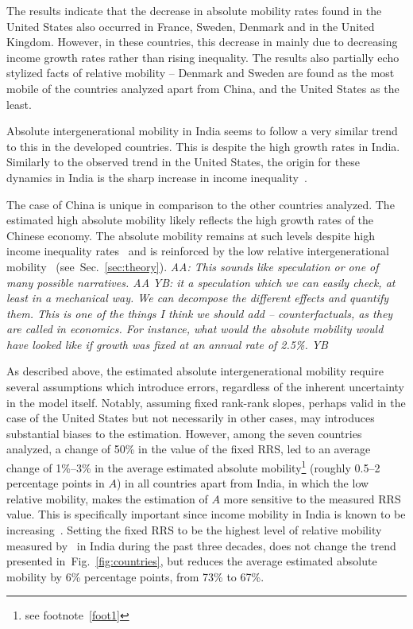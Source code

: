 \documentclass[12pt,a4paper]{article}
\newcommand{\red}[1]{{\color{red} #1}}
\newcommand{\blue}[1]{{\color{blue} #1}}
\newcommand{\sref}[1]{Sec.~\ref{sec:#1}}
\newcommand{\AAA}[1]{\red{{\it AA: #1 AA}}}
\newcommand{\YB}[1]{\blue{{\it YB: #1 YB}}}
\newcommand{\fref}[1]{Fig.~\ref{fig:#1}}
\numberwithin{equation}{section}
\begin{document}
The results indicate that the decrease in absolute mobility rates found in the United States also occurred in France, Sweden, Denmark and in the United Kingdom. However, in these countries, this decrease in mainly due to decreasing income growth rates rather than rising inequality. The results also partially echo stylized facts of relative mobility -- Denmark and Sweden are found as the most mobile of the countries analyzed apart from China, and the United States as the least.

Absolute intergenerational mobility in India seems to follow a very similar trend to this in the developed countries. This is despite the high growth rates in India. Similarly to the observed trend in the United States, the origin for these dynamics in India is the sharp increase in income inequality~\citep{chancel2017india}.

The case of China is unique in comparison to the other countries analyzed. The estimated high absolute mobility likely reflects the high growth rates of the Chinese economy. The absolute mobility remains at such levels despite high income inequality rates~\citep{piketty2017capital} and is reinforced by the low relative intergenerational mobility~\citep{corak2013income,fan2015great} (see~\sref{theory}). \AAA{This sounds like speculation or one of many possible narratives.} \YB{it a speculation which we can easily check, at least in a mechanical way. We can decompose the different effects and quantify them. This is one of the things I think we should add -- counterfactuals, as they are called in economics. For instance, what would the absolute mobility would have looked like if growth was fixed at an annual rate of 2.5\%.}

As described above, the estimated absolute intergenerational mobility require several assumptions which introduce errors, regardless of the inherent uncertainty in the model itself. Notably, assuming fixed rank-rank slopes, perhaps valid in the case of the United States but not necessarily in other cases, may introduces substantial biases to the estimation. However, among the seven countries analyzed, a change of 50\% in the value of the fixed RRS, led to an average change of 1\%--3\% in the average estimated absolute mobility\footnote{see footnote~\ref{foot1}} (roughly 0.5--2 percentage points in $A$) in all countries apart from India, in which the low relative mobility, makes the estimation of $A$ more sensitive to the measured RRS value. This is specifically important since income mobility in India is known to be increasing~\citep{hnatkovska2013breaking}. Setting the fixed RRS to be the highest level of relative mobility measured by~\citet{hnatkovska2013breaking} in India during the past three decades, does not change the trend presented in~\fref{countries}, but reduces the average estimated absolute mobility by 6\% percentage points, from 73\% to 67\%.
\end{document}
